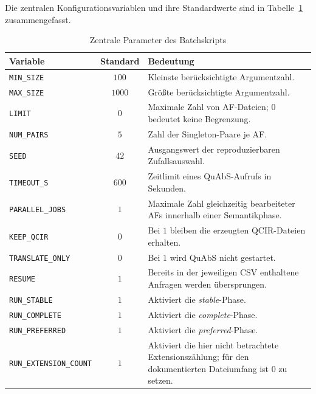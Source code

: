Die zentralen Konfigurationsvariablen und ihre Standardwerte sind in
Tabelle~\ref{tab:appendix-qbf-batch-options} zusammengefasst.

\begin{table}[htb]
    \centering
    \begin{tabularx}{\textwidth}{@{}lcX@{}}
        \toprule
        Variable & Standard & Bedeutung\\
        \midrule
        \texttt{MIN\_SIZE} & \(100\)
            & Kleinste berücksichtigte Argumentzahl.\\
        \texttt{MAX\_SIZE} & \(1000\)
            & Größte berücksichtigte Argumentzahl.\\
        \texttt{LIMIT} & \(0\)
            & Maximale Zahl von AF-Dateien; \(0\) bedeutet keine
              Begrenzung.\\
        \texttt{NUM\_PAIRS} & \(5\)
            & Zahl der Singleton-Paare je AF.\\
        \texttt{SEED} & \(42\)
            & Ausgangswert der reproduzierbaren Zufallsauswahl.\\
        \texttt{TIMEOUT\_S} & \(600\)
            & Zeitlimit eines QuAbS-Aufrufs in Sekunden.\\
        \texttt{PARALLEL\_JOBS} & \(1\)
            & Maximale Zahl gleichzeitig bearbeiteter AFs innerhalb
              einer Semantikphase.\\
        \texttt{KEEP\_QCIR} & \(0\)
            & Bei \(1\) bleiben die erzeugten QCIR-Dateien erhalten.\\
        \texttt{TRANSLATE\_ONLY} & \(0\)
            & Bei \(1\) wird QuAbS nicht gestartet.\\
        \texttt{RESUME} & \(1\)
            & Bereits in der jeweiligen CSV enthaltene Anfragen werden
              übersprungen.\\
        \texttt{RUN\_STABLE} & \(1\)
            & Aktiviert die \emph{stable}-Phase.\\
        \texttt{RUN\_COMPLETE} & \(1\)
            & Aktiviert die \emph{complete}-Phase.\\
        \texttt{RUN\_PREFERRED} & \(1\)
            & Aktiviert die \emph{preferred}-Phase.\\
        \texttt{RUN\_EXTENSION\_COUNT} & \(1\)
            & Aktiviert die hier nicht betrachtete Extensionszählung;
              für den dokumentierten Dateiumfang ist \(0\) zu setzen.\\
        \bottomrule
    \end{tabularx}
    \caption{Zentrale Parameter des Batchskripts}
    \label{tab:appendix-qbf-batch-options}
\end{table}

